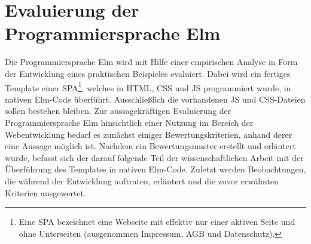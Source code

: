 \chapter{Evaluierung der Programmiersprache Elm}
\label{sec:Evaluierung der Programmiersprache Elm}
Die Programmiersprache Elm wird mit Hilfe einer empirischen Analyse in Form der Entwicklung eines praktischen Beispieles evaluiert. Dabei wird ein fertiges Template einer \ac{SPA}\footnote{Eine \ac{SPA} bezeichnet eine Webseite mit effektiv nur einer aktiven Seite und ohne Unterseiten (ausgenommen Impressum, AGB und Datenschutz).}, welches in \ac{HTML}, \ac{CSS} und \ac{JS} programmiert wurde, in nativen Elm-Code überführt. Ausschließlich die vorhandenen \ac{JS} und \ac{CSS}-Dateien sollen bestehen bleiben. Zur aussagekräftigen Evaluierung der Programmiersprache Elm hinsichtlich einer Nutzung im Bereich der Webentwicklung bedarf es zunächst einiger Bewertungskriterien, anhand derer eine Aussage möglich ist. Nachdem ein Bewertungsmuster erstellt und erläutert wurde, befasst sich der darauf folgende Teil der wissenschaftlichen Arbeit mit der Überführung des Templates in nativen Elm-Code. Zuletzt werden Beobachtungen, die während der Entwicklung auftraten, erläutert und die zuvor erwähnten Kriterien ausgewertet.

